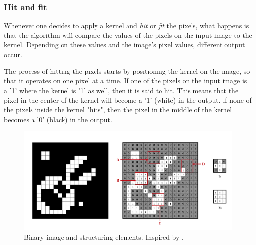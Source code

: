 \subsubsection{Hit and fit}
Whenever one decides to apply a kernel and \textit{hit} or \textit{fit} the pixels, what happens is that the algorithm will compare the values of the pixels on the input image to the kernel. Depending on these values and the image's pixel values, different output occur.

The process of hitting the pixels starts by positioning the kernel on the image, so that it operates on one pixel at a time. If one of the pixels on the input image is a '1' where the kernel is '1' as well, then it is said to hit. This means that the pixel in the center of the kernel will become a '1' (white) in the output. If none of the pixels inside the kernel "hits", then the pixel in the middle of the kernel becomes a '0' (black) in the output.

\begin{figure}[htbp]
\centering
\includegraphics[width=1\textwidth]{Pictures/Theory/FitHitKernels.png}
\caption{Binary image and structuring elements. Inspired by \citep{ip_book}.}
\label{fig:FitHit}
\end{figure}

